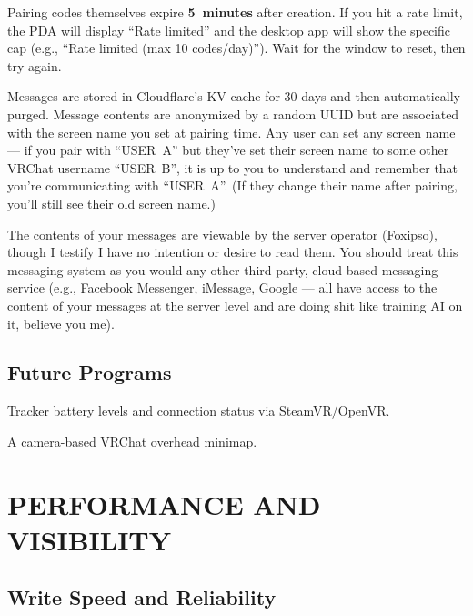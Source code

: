 \documentclass[10pt]{article}
\begin{document}
\noindent Pairing codes themselves expire \textbf{5~minutes} after creation. If you hit a rate limit, the PDA will display ``Rate limited'' and the desktop app will show the specific cap (e.g., ``Rate limited (max 10 codes/day)''). Wait for the window to reset, then try again.

Messages are stored in Cloudflare's KV cache for 30 days and then automatically purged. Message contents are anonymized by a random UUID but are associated with the screen name you set at pairing time. Any user can set any screen name --- if you pair with ``USER~A'' but they've set their screen name to some other VRChat username ``USER~B'', it is up to you to understand and remember that you're communicating with ``USER~A''. (If they change their name after pairing, you'll still see their old screen name.)

The contents of your messages are viewable by the server operator (Foxipso), though I testify I have no intention or desire to read them. You should treat this messaging system as you would any other third-party, cloud-based messaging service (e.g., Facebook Messenger, iMessage, Google --- all have access to the content of your messages at the server level and are doing shit like training AI on it, believe you me).

\newpage
\subsection{Future Programs}

\begin{description}[style=nextline, leftmargin=1em, font=\bfseries\ttfamily, nosep]
  \item[TRACK] Tracker battery levels and connection status via SteamVR/OpenVR.
  \item[MAP] A camera-based VRChat overhead minimap.
\end{description}

\newpage
\section{PERFORMANCE AND VISIBILITY}
\label{sec:performance}

\subsection{Write Speed and Reliability}
\end{document}

